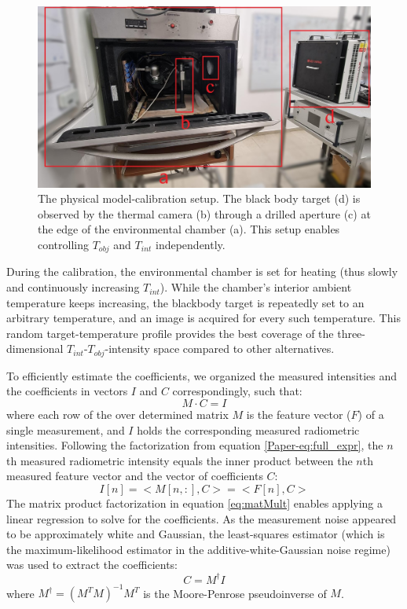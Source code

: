 \documentclass[10pt,twocolumn,letterpaper]{article}
\begin{document}
\begin{figure}
  \centering
  \includegraphics[width=\linewidth]{../figs/methods/calib_setup.jpg}
  \caption{The physical model-calibration setup. The black body target (d) is observed by the thermal camera (b) through a drilled aperture (c) at the edge of the environmental chamber (a). This setup enables controlling $T_\mathit{obj}$ and $T_\mathit{int}$ independently.}
  \label{calib_setup}
\end{figure}

During the calibration, the environmental chamber is set for heating (thus slowly and continuously increasing $T_\mathit{int}$). 
While the chamber's interior ambient temperature keeps increasing, the blackbody target is repeatedly set to an arbitrary temperature, and an image is acquired for every such temperature.
This random target-temperature profile provides the best coverage of the three-dimensional $T_\mathit{int}$-$T_\mathit{obj}$-intensity space compared to other alternatives.


To efficiently estimate the coefficients, we organized the measured intensities and the coefficients in vectors $I$ and $C$ correspondingly, such that:
\begin{equation} \label{eq:matMult}
  M \cdot C = I
\end{equation}
where each row of the over determined matrix $M$ is the feature vector ($F$) of a single measurement, and $I$
holds the corresponding measured radiometric intensities.
Following the factorization from equation \ref{Paper-eq:full_expr}, the $n$th measured radiometric intensity equals the inner product between the $n$th measured feature vector and the vector of coefficients $C$:
\begin{equation}
  I[n] = <M[n, :], C> = <F[n], C>
\end{equation}
The matrix product factorization in equation \ref{eq:matMult} enables applying a linear regression to solve for the coefficients.
As the measurement noise appeared to be approximately white and Gaussian, the least-squares estimator (which is the maximum-likelihood estimator in the additive-white-Gaussian noise regime) was used to extract the coefficients:
\begin{equation} \label{eq:PseudoInverse}
  C = M^{\dagger} I
\end{equation}
where $M^{\dagger} = (M^TM)^{-1}M^T$ is the Moore-Penrose pseudoinverse of $M$.
\end{document}
